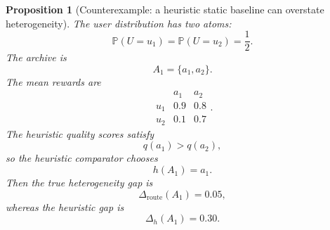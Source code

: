 \documentclass{article} %
\newtheorem{proposition}[theorem]{Proposition}
\begin{document}
\begin{proposition}[Counterexample: a heuristic static baseline can overstate heterogeneity]
\label{prop:9}
The user distribution has two atoms:
\begin{equation}
\label{eq:app-fourth-heur-ex-u}
\mathbb{P}(U=u_1)
=
\mathbb{P}(U=u_2)
=
\frac{1}{2}.
\end{equation}
The archive is
\begin{equation}
\label{eq:app-fourth-heur-ex-a}
A_1
=
\{a_1,a_2\}.
\end{equation}
The mean rewards are
\begin{equation}
\label{eq:app-fourth-heur-ex-matrix}
\begin{array}{c|cc}
& a_1 & a_2 \\
\hline
u_1 & 0.9 & 0.8 \\
u_2 & 0.1 & 0.7
\end{array}.
\end{equation}
The heuristic quality scores satisfy
\begin{equation}
\label{eq:app-fourth-heur-ex-q}
q(a_1)>q(a_2),
\end{equation}
so the heuristic comparator chooses
\begin{equation}
\label{eq:app-fourth-heur-ex-h}
h(A_1)=a_1.
\end{equation}
Then the true heterogeneity gap is
\begin{equation}
\label{eq:app-fourth-heur-ex-true-gap}
\Delta_{\mathrm{route}}(A_1)=0.05,
\end{equation}
whereas the heuristic gap is
\begin{equation}
\label{eq:app-fourth-heur-ex-bad-gap}
\Delta_h(A_1)=0.30.
\end{equation}
\end{proposition}
\end{document}
